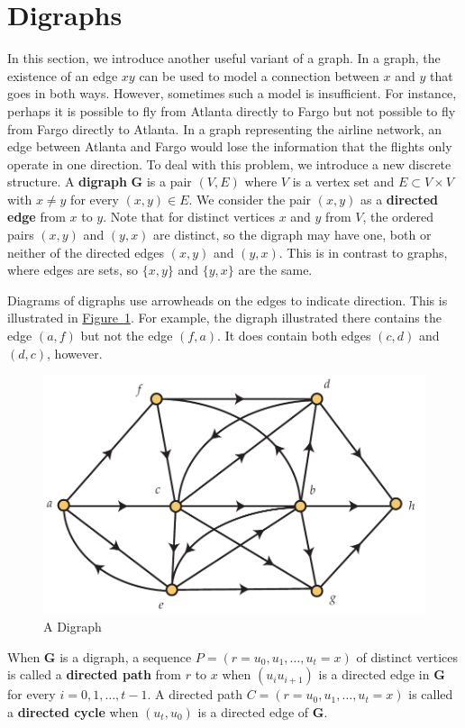 \documentclass[10pt,]{book}
\newcommand{\terminology}[1]{\textbf{#1}}
\theoremstyle{plain}
\theoremstyle{definition}
\theoremstyle{definition}
\theoremstyle{definition}
\theoremstyle{definition}
\numberwithin{equation}{section}
\newcommand{\bfG}{\mathbf{G}}
\begin{document}
\section[{Digraphs}]{Digraphs}\label{s_graphalgorithms_digraphs}
\hypertarget{p-193}{}%
In this section, we introduce another useful variant of a graph. In a graph, the existence of an edge \(xy\) can be used to model a connection between \(x\) and \(y\) that goes in both ways. However, sometimes such a model is insufficient. For instance, perhaps it is possible to fly from Atlanta directly to Fargo but not possible to fly from Fargo directly to Atlanta. In a graph representing the airline network, an edge between Atlanta and Fargo would lose the information that the flights only operate in one direction. To deal with this problem, we introduce a new discrete structure. A \terminology{digraph} \(\bfG\) is a pair \((V,E)\) where \(V\) is a vertex set and \(E\subset V\times V\) with \(x\neq y\) for every \((x,y)\in E\). We consider the pair \((x,y)\) as a \terminology{directed edge} from \(x\) to \(y\). Note that for distinct vertices \(x\) and \(y\) from \(V\), the ordered pairs \((x,y)\) and \((y,x)\) are distinct, so the digraph may have one, both or neither of the directed edges \((x,y)\) and \((y,x)\). This is in contrast to graphs, where edges are sets, so \(\{x,y\}\) and \(\{y,x\}\) are the same.%
\par
\hypertarget{p-194}{}%
Diagrams of digraphs use arrowheads on the edges to indicate direction.  This is illustrated in \hyperref[fig_graphalgorithms_digraph]{Figure~\ref{fig_graphalgorithms_digraph}}. For example, the digraph illustrated there contains the edge \((a,f)\) but not the edge \((f,a)\). It does contain both edges \((c,d)\) and \((d,c)\), however.%
\begin{figure}
\centering
\includegraphics[width=0.85\linewidth]{images/digraph}
\caption{A Digraph\label{fig_graphalgorithms_digraph}}
\end{figure}
\hypertarget{p-195}{}%
When \(\bfG\) is a digraph, a sequence \(P=(r=u_0,u_1,\dots,u_t=x)\) of distinct vertices is called a \terminology{directed path} from \(r\) to \(x\) when \((u_iu_{i+1})\) is a directed edge in \(\bfG\) for every \(i=0,1,\dots,t-1\). A directed path \(C=(r=u_0,u_1,\dots,u_t=x)\) is called a \terminology{directed cycle} when \((u_t,u_0)\) is a directed edge of \(\bfG\).%
\typeout{************************************************}
\typeout{************************************************}
\end{document}
